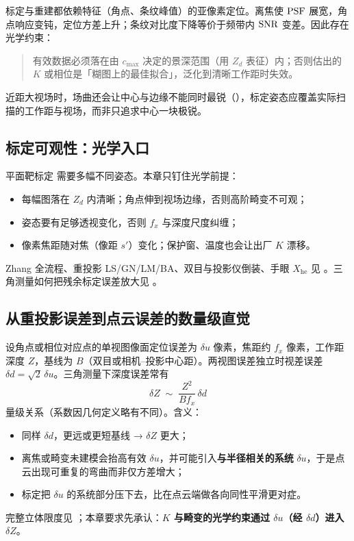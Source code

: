 标定与重建都依赖特征（角点、条纹峰值）的亚像素定位。离焦使 $\mathrm{PSF}$ 展宽，角点响应变钝，定位方差上升；条纹对比度下降等价于频带内 $\mathrm{SNR}$ 变差。因此存在光学约束：
\begin{quote}
有效数据必须落在由 $c_{\max}$ 决定的景深范围（用 $Z_d$ 表征）内；否则估出的 $K$ 或相位是「糊图上的最佳拟合」，泛化到清晰工作距时失效。
\end{quote}
近距大视场时，场曲还会让中心与边缘不能同时最锐（），标定姿态应覆盖实际扫描的工作距与视场，而非只追求中心一块极锐。

\subsection{标定可观性：光学入口}

平面靶标定 \citep{Zhang2000Calibration} 需要多幅不同姿态。本章只钉住光学前提：
\begin{itemize}
  \item 每幅图落在 $Z_d$ 内清晰；角点伸到视场边缘，否则高阶畸变不可观；
  \item 姿态要有足够透视变化，否则 $f_x$ 与深度尺度纠缠；
  \item 像素焦距随对焦（像距 $s'$）变化；保护窗、温度也会让出厂 $K$ 漂移。
\end{itemize}
Zhang 全流程、重投影 LS/GN/LM/BA、双目与投影仪倒装、手眼 $X_{\mathrm{he}}$ 见 。三角测量如何把残余标定误差放大见 。

\subsection{从重投影误差到点云误差的数量级直觉}


设角点或相位对应点的单视图像面定位误差为 $\delta u$ 像素，焦距约 $f_x$ 像素，工作距深度 $Z$，基线为 $B$（双目或相机–投影中心距）。两视图误差独立时视差误差 $\delta d=\sqrt2\,\delta u$。三角测量下深度误差常有
\[
  \delta Z \;\sim\; \frac{Z^{2}}{B f_x}\,\delta d
\]
量级关系（系数因几何定义略有不同）。含义：
\begin{itemize}
  \item 同样 $\delta d$，更远或更短基线 → $\delta Z$ 更大；
  \item 离焦或畸变未建模会抬高有效 $\delta u$，并可能引入\textbf{与半径相关的系统} $\delta u$，于是点云出现可重复的弯曲而非仅方差增大；
  \item 标定把 $\delta u$ 的系统部分压下去，比在点云端做各向同性平滑更对症。
\end{itemize}
完整立体限度见 ；本章要求先承认：\textbf{$K$ 与畸变的光学约束通过 $\delta u$（经 $\delta d$）进入 $\delta Z$}。


